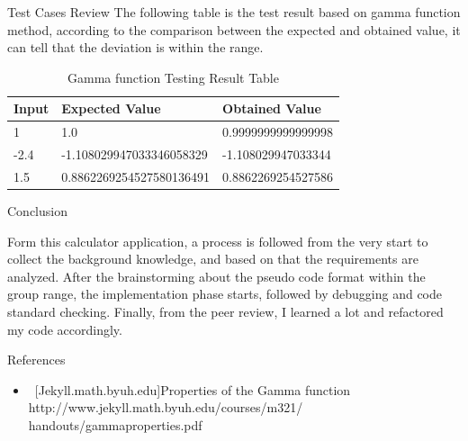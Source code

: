 \documentclass[final]{beamer}
\newlength{\onecolwid}
\begin{document}
\begin{frame}[t]
\begin{columns}[t]
\begin{column}{\onecolwid}
\begin{block}{Test Cases Review}
The following table is the test result based on gamma function method, according to the comparison between the expected and obtained value, it can tell that the deviation is within the range.
\noindent
\begin{table}
\begin{tabular}{l l l}
\toprule
\textbf{Input } & \textbf{ Expected Value} & \textbf{Obtained Value}\\
\midrule
1 &  1.0 & 0.9999999999999998 \\
-2.4 &  -1.108029947033346058329 & -1.108029947033344 \\
1.5 &  0.8862269254527580136491 & 0.8862269254527586 \\
\bottomrule
\end{tabular}
\caption{Gamma function Testing Result Table}
\end{table}

\end{block}


\begin{block}{Conclusion}

Form this calculator application, a process is followed from the very start to collect the background knowledge, and based on that the requirements are analyzed. After the brainstorming about the pseudo code format within the group range, the implementation phase starts, followed by debugging and code standard checking. Finally, from the peer review, I learned a lot and refactored my code accordingly.

\end{block}


\begin{block}{References}

\begin{itemize}
\setlength{\itemsep}{20pt}
\item \
[Jekyll.math.byuh.edu]Properties of the Gamma function \\
\indent \indent\indent\indent\indent\indent\indent http://www.jekyll.math.byuh.edu/courses/m321/\\handouts/gammaproperties.pdf


\end{itemize}
\end{block}
\end{column}
\end{columns}
\end{frame}
\end{document}
